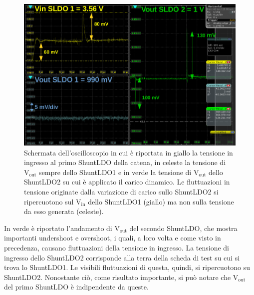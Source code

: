 \begin{figure}[h!]
\centering
\includegraphics[scale=.32]{Immagini/ScreenSerie}
\caption{Schermata dell'oscilloscopio in cui è riportata in giallo la tensione in ingresso al primo ShuntLDO della catena,  in celeste la tensione di $\mathrm{V_{out}}$ sempre dello ShuntLDO1 e in verde la tensione di $\mathrm{V_{out}}$ dello ShuntLDO2 su cui è applicato il carico dinamico. Le fluttuazioni in tensione originate dalla variazione di carico sullo ShuntLDO2 si ripercuotono sul $\mathrm{V_{in}}$ dello ShuntLDO1 (giallo) ma non sulla tensione da esso generata (celeste).}
\label{ScreenSerie}
\end{figure}
In verde è riportato l'andamento di $\mathrm{V_{out}}$ del secondo ShuntLDO, che mostra importanti undershoot e overshoot, i quali, a loro volta e come visto in precedenza, causano fluttuazioni della tensione in ingresso. 
La tensione di ingresso dello ShuntLDO2 corrisponde alla terra della scheda di test su cui si trova lo ShuntLDO1.
Le visibili fluttuazioni di questa, quindi, si ripercuotono su ShuntLDO2.
Nonostante ciò, come risultato importante, si può notare che $\mathrm{V_{out}}$ del primo ShuntLDO è indipendente da queste.
